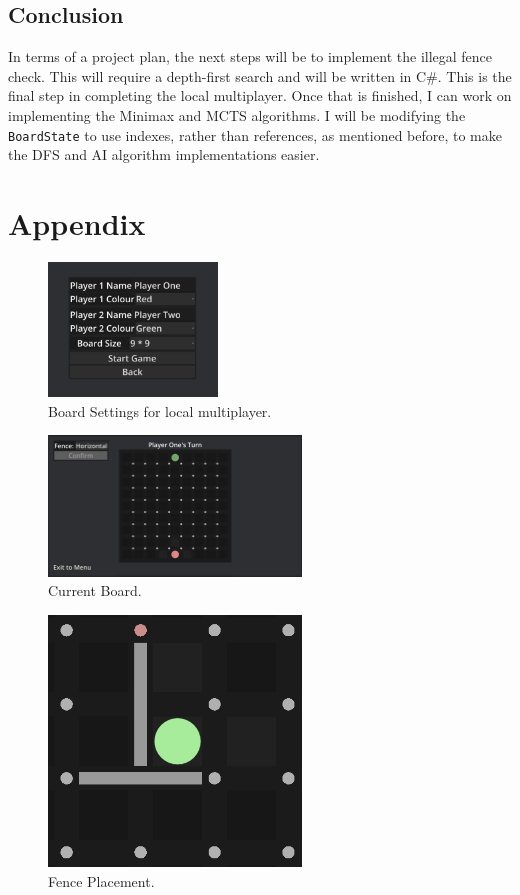 \documentclass[progress]{cmpreport}
\begin{document}
\subsection{Conclusion}
In terms of a project plan, the next steps will be to implement the illegal fence check. This will require a depth-first search and will be written in C\#. This is the final step in completing the local multiplayer. Once that is finished, I can work on implementing the Minimax and MCTS algorithms. I will be modifying the \texttt{BoardState} to use indexes, rather than references, as mentioned before, to make the DFS and AI algorithm implementations easier.

\newpage
\appendix
\section{Appendix}
\begin{figure}[h]
    \centering
    \includegraphics[width=0.4\textwidth]{images/board_options.png}
    \caption{Board Settings for local multiplayer.}
    \label{fig:options}
\end{figure}
\begin{figure}[h]
    \centering
    \includegraphics[width=0.6\textwidth]{images/current_board.png}
    \caption{Current Board.}
    \label{fig:board}
\end{figure}
\begin{figure}[h]
    \centering
    \includegraphics[width=0.6\textwidth]{images/fence_placement.png}
    \caption{Fence Placement.}
    \label{fig:fence_placement}
\end{figure}
\end{document}
